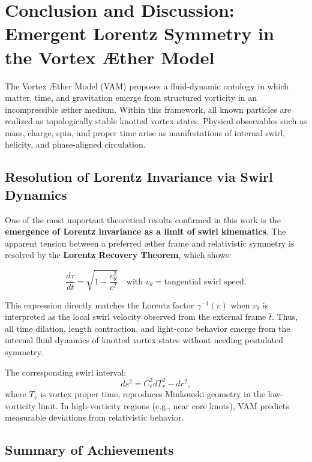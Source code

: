 \section{Conclusion and Discussion: Emergent Lorentz Symmetry in the Vortex Æther Model}

The Vortex \AE{}ther Model (VAM) proposes a fluid-dynamic ontology in which matter, time, and gravitation emerge from structured vorticity in an incompressible æther medium. Within this framework, all known particles are realized as topologically stable knotted vortex states. Physical observables such as mass, charge, spin, and proper time arise as manifestations of internal swirl, helicity, and phase-aligned circulation.

\subsection*{Resolution of Lorentz Invariance via Swirl Dynamics}

One of the most important theoretical results confirmed in this work is the \textbf{emergence of Lorentz invariance as a limit of swirl kinematics}. The apparent tension between a preferred æther frame and relativistic symmetry is resolved by the \textbf{Lorentz Recovery Theorem}, which shows:

\[
\frac{d\tau}{dt} = \sqrt{1 - \frac{v_\theta^2}{c^2}} \quad \text{with } v_\theta = \text{tangential swirl speed}.
\]

This expression directly matches the Lorentz factor \( \gamma^{-1}(v) \) when \( v_\theta \) is interpreted as the local swirl velocity observed from the external frame \( \bar{t} \). Thus, all time dilation, length contraction, and light-cone behavior emerge from the internal fluid dynamics of knotted vortex states without needing postulated symmetry.

The corresponding swirl interval:
\[
ds^2 = C_e^2 dT_v^2 - dr^2,
\]
where \( T_v \) is vortex proper time, reproduces Minkowski geometry in the low-vorticity limit. In high-vorticity regions (e.g., near core knots), VAM predicts measurable deviations from relativistic behavior.

\subsection*{Summary of Achievements}

